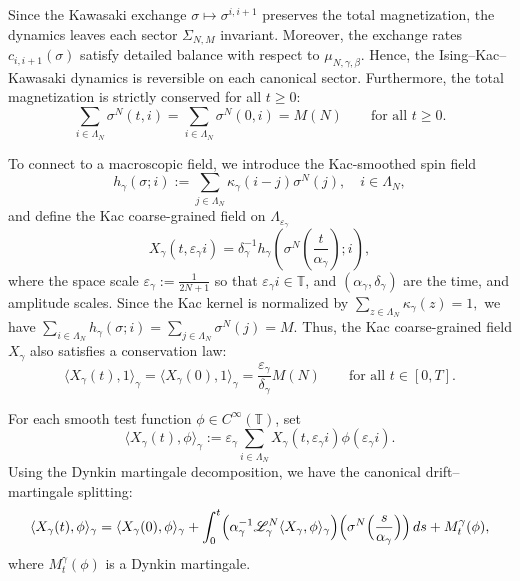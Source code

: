 \documentclass{article}
\begin{document}
Since the Kawasaki exchange \(\sigma\mapsto \sigma^{i,i+1}\) preserves the total magnetization, the dynamics leaves each sector \(\Sigma_{N,M}\) invariant. Moreover, the exchange rates $c_{i,i+1}(\sigma)$ satisfy detailed balance with respect to \(\mu_{N,\gamma,\beta}\). 
Hence, the Ising--Kac--Kawasaki dynamics is reversible on each canonical sector. Furthermore, the total magnetization is strictly conserved for all $t\ge0$:
\[
\sum_{i\in\Lambda_N}\sigma^N(t,i)=\sum_{i\in\Lambda_N}\sigma^N(0,i) = M(N)
\qquad\text{for all }t\ge0.
\]

To connect to a macroscopic field, we introduce the Kac-smoothed spin field
\[
h_\gamma(\sigma;i):=\sum_{j\in\Lambda_N}\kappa_\gamma(i-j)\sigma^N(j), \quad i\in \Lambda_N,
\]
and define the Kac coarse-grained field on $\Lambda_{\varepsilon_{\gamma}}$
\[
X_\gamma(t,\varepsilon_\gamma i) = \delta_\gamma^{-1}
h_\gamma\!\left(\sigma^N \left(\frac{t}{\alpha_\gamma}\right);i\right),
\]
where the space scale $\varepsilon_\gamma := \frac{1}{2N+1}$ so that $\varepsilon_\gamma i\in \mathbb T$, and \((\alpha_\gamma,\delta_\gamma)\) are the time, and amplitude scales.
Since the Kac kernel is normalized by
\(
\sum_{z\in\Lambda_N}\kappa_\gamma(z)=1,
\)
we have $\sum_{i\in\Lambda_N}h_\gamma(\sigma;i)
=
\sum_{j\in\Lambda_N} \sigma^N(j) = M$.
Thus, the Kac coarse-grained field $X_\gamma$ also satisfies a conservation law:
\[
\langle X_\gamma(t),1\rangle_\gamma
=
\langle X_\gamma(0),1\rangle_\gamma = \frac{\varepsilon_{\gamma}}{\delta_{\gamma}} M(N)
\qquad\text{for all }t\in[0,T].
\]

For each smooth test function \(\phi\in C^\infty(\mathbb T)\), set
\[
\langle X_\gamma(t),\phi\rangle_\gamma
:=
\varepsilon_\gamma\sum_{i\in\Lambda_N}
X_\gamma(t,\varepsilon_\gamma i)\phi(\varepsilon_\gamma i).
\]
Using the Dynkin martingale decomposition, we have the canonical drift–martingale splitting:
\begin{equation}\label{eq:dynkin}
    \langle X_\gamma(t),\phi\rangle_\gamma
=
\langle X_\gamma(0),\phi\rangle_\gamma
+
\int_0^t
\Bigl(\alpha_\gamma^{-1}\mathscr L_\gamma^{N}\langle X_\gamma,\phi\rangle_\gamma\Bigr)
\Big(\sigma^N \Big(\frac{s}{\alpha_{\gamma}}\Big)\Big)\,ds
+ M_t^\gamma(\phi),
\end{equation}
where \(M_t^\gamma(\phi)\) is a Dynkin martingale.
\end{document}
